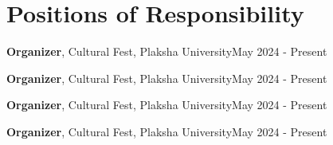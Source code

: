 \section{\textbf{Positions of Responsibility}}
\resumeSubHeadingListStart

    \posSubheading
    {\textbf{Organizer}, Cultural Fest, Plaksha University}{May 2024 - Present}

   
    \posSubheading
    {\textbf{Organizer}, Cultural Fest, Plaksha University}{May 2024 - Present}


    \posSubheading
    {\textbf{Organizer}, Cultural Fest, Plaksha University}{May 2024 - Present}


    \posSubheading
    {\textbf{Organizer}, Cultural Fest, Plaksha University}{May 2024 - Present}


\vspace{-5pt}
\resumeSubHeadingListEnd